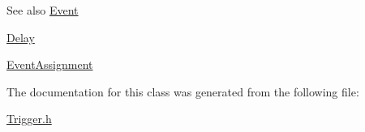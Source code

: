 \begin{DoxySeeAlso}{See also}
\hyperlink{class_event}{Event} 

\hyperlink{class_delay}{Delay} 

\hyperlink{class_event_assignment}{Event\+Assignment} 
\end{DoxySeeAlso}


The documentation for this class was generated from the following file\+:\begin{DoxyCompactItemize}
\item 
\hyperlink{_trigger_8h}{Trigger.\+h}\end{DoxyCompactItemize}
